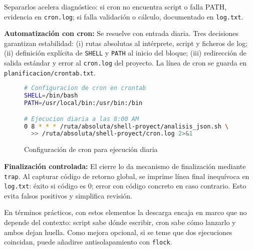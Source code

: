 Separarlos acelera diagnóstico: si cron no encuentra script o falla PATH, evidencia en \texttt{cron.log}; si falla validación o cálculo, documentado en \texttt{log.txt}.

\textbf{Automatización con cron:} Se resuelve con entrada diaria. Tres decisiones garantizan estabilidad: (i) rutas absolutas al intérprete, script y ficheros de log; (ii) definición explícita de \texttt{SHELL} y \texttt{PATH} al inicio del bloque; (iii) redirección de salida estándar y error al \texttt{cron.log} del proyecto. La línea de cron se guarda en \texttt{planificacion/crontab.txt}.

\begin{figure}[H]
  \footnotesize
  \begin{lstlisting}[language=bash]
# Configuracion de cron en crontab
SHELL=/bin/bash
PATH=/usr/local/bin:/usr/bin:/bin

# Ejecucion diaria a las 8:00 AM
0 8 * * * /ruta/absoluta/shell-proyect/analisis_json.sh \
  >> /ruta/absoluta/shell-proyect/cron.log 2>&1
\end{lstlisting}
  \caption{Configuración de cron para ejecución diaria}
\end{figure}

\textbf{Finalización controlada:} El cierre lo da mecanismo de finalización mediante \texttt{trap}. Al capturar código de retorno global, se imprime línea final inequívoca en \texttt{log.txt}: éxito si código es 0; error con código concreto en caso contrario. Esto evita falsos positivos y simplifica revisión.

En términos prácticos, con estos elementos la descarga encaja en marco que no depende del contexto: script sabe dónde escribir, cron sabe cómo lanzarlo y ambos dejan huella. Como mejora opcional, si se teme que dos ejecuciones coincidan, puede añadirse antisolapamiento con \texttt{flock}.

